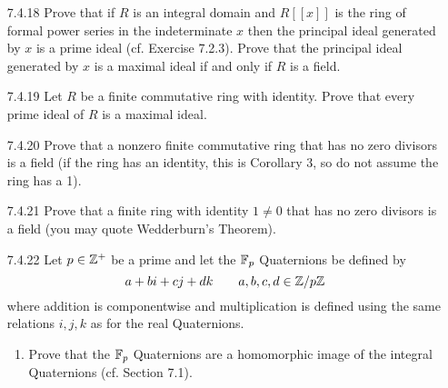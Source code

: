 \begin{enumerate}
   \item[7.4.18]  Prove that if $R$ is an integral domain and $R[[x]]$ is the
                  ring of formal power series in the indeterminate $x$ then the
                  principal ideal generated by $x$ is a prime ideal
                  (cf. Exercise 7.2.3). Prove that the principal ideal generated
                  by $x$ is a maximal ideal if and only if $R$ is a field.
   \item[7.4.19]  Let $R$ be a finite commutative ring with identity. Prove that
                  every prime ideal of $R$ is a maximal ideal.
   \item[7.4.20]  Prove that a nonzero finite commutative ring that has no zero
                  divisors is a field (if the ring has an identity, this is
                  Corollary 3, so do not assume the ring has a 1).
   \item[7.4.21]  Prove that a finite ring with identity $1 $ that has no
                  zero divisors is a field (you may quote Wedderburn's Theorem).
   \item[7.4.22]  Let $p \in \mathbb{Z}^+$ be a prime and let the $\mathbb{F}_p$ Quaternions be
                  defined by
                  $$a + bi + cj + dk \qquad a, b, c, d \in \mathbb{Z}/p\mathbb{Z}$$
                  where addition is componentwise and multiplication is defined
                  using the same relations $i, j, k$ as for the real
                  Quaternions.
                  \begin{enumerate}
                     \item Prove that the $\mathbb{F}_p$ Quaternions are a homomorphic
                           image of the integral Quaternions (cf. Section 7.1).

\end{enumerate}
\end{enumerate}

